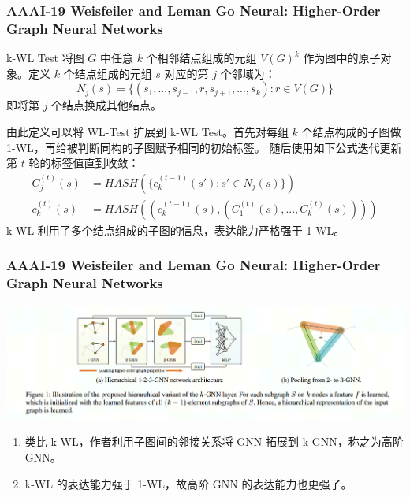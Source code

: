 \documentclass{beamer}
\begin{document}
\begin{frame}

  \frametitle{AAAI-19 Weisfeiler and Leman Go Neural: Higher-Order Graph Neural Networks}
  \begin{block}{k-WL Test}
    将图 $G$ 中任意 $k$ 个相邻结点组成的元组 $V(G)^k$ 作为图中的原子对象。定义 $k$ 个结点组成的元组 $s$ 对应的第 $j$ 个邻域为：
    $$
      N_j(s) = \{(s_1, ..., s_{j-1}, r, s_{j+1}, ...,s_k) : r \in V(G)\}
    $$
    即将第 $j$ 个结点换成其他结点。

    由此定义可以将 WL-Test 扩展到 k-WL Test。首先对每组 $k$ 个结点构成的子图做 1-WL，再给被判断同构的子图赋予相同的初始标签。
    随后使用如下公式迭代更新第 $t$ 轮的标签值直到收敛：
    \begin{align*}
      C_j^{(t)}(s) &= HASH(\{c_{k}^{(t-1)}(s') : s' \in N_j(s)\}) \\
      c_k^{(t)}(s) &= HASH((c_k^{(t-1)}(s), (C_1^{(t)}(s), ..., C_k^{(t)}(s))))
    \end{align*}
    k-WL 利用了多个结点组成的子图的信息，表达能力严格强于 1-WL。
  \end{block}
\end{frame}

\begin{frame}

  \frametitle{AAAI-19 Weisfeiler and Leman Go Neural: Higher-Order Graph Neural Networks}
  \includegraphics[scale=0.5]{figs/k-GNN.png}
  \begin{enumerate}
    \item 类比 k-WL，作者利用子图间的邻接关系将 GNN 拓展到 k-GNN，称之为高阶 GNN。
    \item k-WL 的表达能力强于 1-WL，故高阶 GNN 的表达能力也更强了。
  \end{enumerate}

\end{frame}
\end{document}
